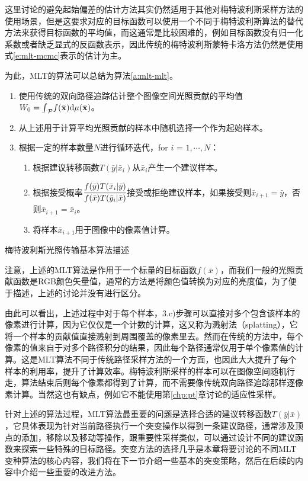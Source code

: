 这里讨论的避免起始偏差的估计方法其实仍然适用于其他对梅特波利斯采样方法的使用场景，但是这要求对应的目标函数可以使用一个不同于梅特波利斯算法的替代方法来获得目标函数的平均值，而这通常是比较困难的，例如目标函数没有归一化系数或者缺乏显式的反函数表示，因此传统的梅特波利斯蒙特卡洛方法仍然是使用式\ref{e:mlt-mcmc}表示的估计为主。

为此，MLT的算法可以总结为算法\ref{a:mlt-mlt}。

\begin{algorithm}
\begin{enumerate}
	\item 使用传统的双向路径追踪估计整个图像空间光照贡献的平均值$W_0={\rm \int}_{\mathcal{P}}f(\bar{\mathbf{x}}){\rm d}\mu(\bar{\mathbf{x}})$。
	\item 从上述用于计算平均光照贡献的样本中随机选择一个作为起始样本。
	\item 根据一定的样本数量$N$进行循环迭代，for $i$ = $1,\cdots,N$：
	\begin{enumerate}
		\item 根据建议转移函数$T(\bar{y}|\bar{x}_i)$从$\bar{x}_i$产生一个建议样本。
		\item 根据接受概率$ \cfrac{f(\bar{y})T(\bar{x}_i|\bar{y})}{f(\bar{x})T(\bar{y}_i|\bar{x})}$接受或拒绝建议样本，如果接受则$\bar{x}_{i+1}=\bar{y}$，否则$\bar{x}_{i+1}=\bar{x}_i$。
		\item 将样本$\bar{x}_{i+1}$用于图像中的像素值计算。
	\end{enumerate}
\end{enumerate}
\caption{梅特波利斯光照传输基本算法描述}
\label{a:mlt-mlt}
\end{algorithm}

注意，上述的MLT算法是作用于一个标量的目标函数$f(\bar{x})$，而我们一般的光照贡献函数是RGB颜色矢量值，通常的方法是将颜色值转换为对应的亮度值，为了便于描述，上述的讨论并没有进行区分。

由此可以看出，上述过程中对于每个样本，3.c)步骤可以直接对多个包含该样本的像素进行计算，因为它仅仅是一个计数的计算，这又称为溅射法（splatting），它将一个样本的贡献值直接溅射到周围覆盖的像素里去。然而在传统的方法中，每个像素的值来自于对多个路径积分的结果，因此每个路径通常仅用于单个像素值的计算。这是MLT算法不同于传统路径采样方法的一个方面，也因此大大提升了每个样本的利用率，提升了计算效率。梅特波利斯采样的样本可以在图像空间随机行走，算法结束后则每个像素都得到了计算，而不需要像传统双向路径追踪那样逐像素计算。当然这也有缺点，例如它不能使用第\ref{chp:pt}章讨论的适应性采样。

针对上述的算法过程，MLT算法最重要的问题是选择合适的建议转移函数$T(\bar{y}|\bar{x})$，它具体表现为针对当前路径执行一个突变操作以得到一条建议路径，通常涉及顶点的添加，移除以及移动等操作，跟重要性采样类似，可以通过设计不同的建议函数来探索一些特殊的目标路径。突变方法的选择几乎是本章将要讨论的不同MLT变种算法的核心内容，我们将在下一节介绍一些基本的突变策略，然后在后续的内容中介绍一些重要的改进方法。



